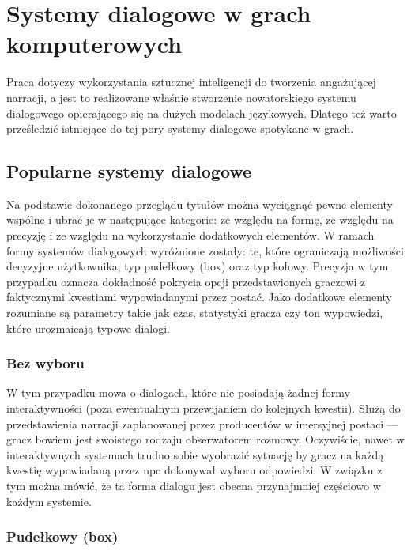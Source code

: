\graphicspath{{chapters/chapter3/imgs/}}

\chapter{Systemy dialogowe w grach komputerowych}\label{chapter:ch3}

Praca dotyczy wykorzystania sztucznej inteligencji do tworzenia angażującej narracji, a jest
to realizowane właśnie stworzenie nowatorskiego systemu dialogowego opierającego się
na dużych modelach językowych. Dlatego też warto prześledzić istniejące do tej pory systemy
dialogowe spotykane w grach.

\section{Popularne systemy dialogowe}\label{subsection:ch3_1}

Na podstawie dokonanego przeglądu tytułów można wyciągnąć pewne elementy wspólne i ubrać je
w następujące kategorie: ze względu na formę, ze względu na precyzję i ze względu na wykorzystanie
dodatkowych elementów. W ramach formy systemów dialogowych wyróżnione zostały: te, które ograniczają
możliwości decyzyjne użytkownika; typ pudełkowy (box) oraz typ kołowy. Precyzja w tym przypadku
oznacza dokładność pokrycia opcji przedstawionych graczowi z faktycznymi kwestiami wypowiadanymi
przez postać. Jako dodatkowe elementy rozumiane są parametry takie jak czas, statystyki gracza
czy ton wypowiedzi, które urozmaicają typowe dialogi.

\subsection{Bez wyboru}

W tym przypadku mowa o dialogach, które nie posiadają żadnej formy interaktywności (poza
ewentualnym przewijaniem do kolejnych kwestii). Służą do przedstawienia narracji zaplanowanej
przez producentów w imersyjnej postaci --- gracz bowiem jest swoistego rodzaju obserwatorem
rozmowy. Oczywiście, nawet w interaktywnych systemach trudno sobie wyobrazić sytuację by gracz
na każdą kwestię wypowiadaną przez \gls{npc} dokonywał wyboru odpowiedzi. W związku z tym można mówić,
że ta forma dialogu jest obecna przynajmniej częściowo w każdym systemie.

\subsection{Pudełkowy (box)}

